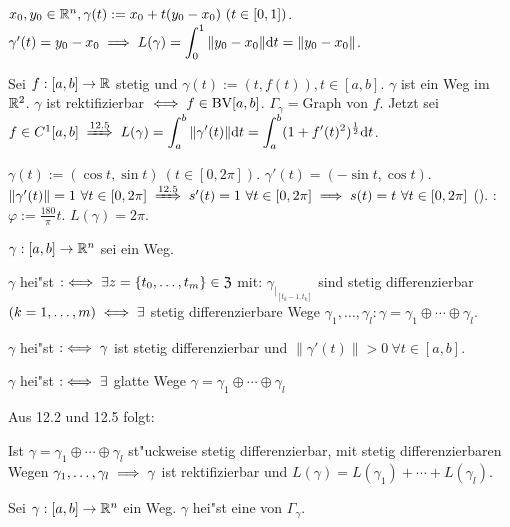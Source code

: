 \documentclass[a4paper,twoside,DIV15,BCOR12mm]{scrbook}
\begin{document}
\begin{beispiele}
\item $x_0, y_0\in\mathbb{R}^n, \gamma(t):=x_0+t(y_0-x_0)\ (t\in [0,1])$. $\gamma'(t)=y_0-x_0\implies L(\gamma)=\displaystyle\int_0^1\|y_0-x_0\|\text{d}t=\|y_0-x_0\|$.
\item Sei $f:[a,b]\to\mathbb{R}$ stetig und $\gamma(t):=(t, f(t)), t\in[a,b]$. $\gamma$ ist ein Weg im $\mathbb{R}^2$. $\gamma$ ist rektifizierbar $\iff f \in \text{BV}[a,b]$. $\Gamma_\gamma=$Graph von $f$. Jetzt sei $f\in C^1[a,b] \folgtnach{12.5} L(\gamma)=\ds\int_a^b\|\gamma'(t)\|\text{d}t=\ds\int_a^b (1+f'(t)^2)^{\frac{1}{2}}\text{d}t$.
\item $\gamma(t):=(\cos t, \sin t)\ (t\in [0,2\pi])$. $\gamma'(t)=(-\sin t, \cos t)$. $\|\gamma'(t)\|=1\ \forall t\in [0,2\pi]\folgtnach{12.5}s'(t)=1\ \forall t\in[0,2\pi]\folgt s(t)=t\ \forall t\in[0,2\pi]$ (). : $\varphi:=\frac{180}{\pi}t$. $L(\gamma)=2\pi$.
\end{beispiele}

\begin{definition*}
$\gamma:[a,b]\to\mathbb{R}^n$ sei ein Weg.
\begin{liste}
\item $\gamma$ hei"st  $:\iff\exists z=\{t_0,\ldots,t_m\}\in\mathfrak{Z}$ mit: $\gamma_{|_{[t_k-1,t_k]}}$ sind stetig differenzierbar $(k=1,\ldots,m)\iff\exists$ stetig differenzierbare Wege $\gamma_1,\ldots,\gamma_l: \gamma=\gamma_1\oplus\cdots\oplus\gamma_l$.
\item $\gamma$ hei"st  $:\iff \gamma$ ist stetig differenzierbar und $\|\gamma'(t)\|>0\ \forall t\in[a,b]$.
\item $\gamma$ hei"st  $:\iff\exists$ glatte Wege $\gamma=\gamma_1\oplus\cdots\oplus\gamma_l$
\end{liste}
\end{definition*}

Aus 12.2 und 12.5 folgt:

\begin{satz}
Ist $\gamma=\gamma_1\oplus\cdots\oplus\gamma_l$ st"uckweise stetig differenzierbar, mit stetig differenzierbaren Wegen $\gamma_1,\ldots,\gamma_l\implies \gamma$ ist rektifizierbar und $L(\gamma)=L(\gamma_1)+\cdots+L(\gamma_l)$.
\end{satz}

\begin{definition*}
Sei $\gamma:[a,b]\to\mathbb{R}^n$ ein Weg. $\gamma$ hei"st eine  von $\Gamma_\gamma$.
\end{definition*}
\end{document}
